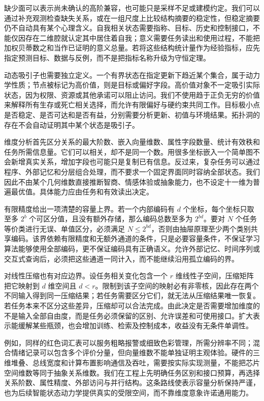 缺少面可以表示尚未确认的高阶兼容，也可能只是采样不足或建模约定。我们可以通过补充观测检查缺失关系，或在一组尺度上比较结构摘要的稳定性，但稳定摘要仍不自动具有某个心理含义。自我相关状态需要指称、目标、历史和控制接口，不能仅因存在二维腔就认定其中居住着自我；意义需要任务读出和使用过程，不能把加权贝蒂数之和当作已证明的意义总量。若将这些结构统计量作为经验指标，应先指定预测目标、数据与反例，而不是把指标名称升级为守恒定理。

动态吸引子也需要独立定义。一个有界状态在指定更新下趋近某个集合，属于动力学性质；节点被标记为高价值，则是目标或偏好字段。高价值对象不一定吸引实际状态，因为权限、资源或其他承诺可以阻止访问。我们不使用趋于正负无穷的价值来解释所有生存或死亡相关选择，而允许有限偏好与硬约束共同工作。目标极小点是否稳定、是否可达和是否有益，分别需要分析更新、初值与环境结果。拓扑洞的存在不会自动证明其中某个状态是吸引子。

维度分析首先区分关系的最大阶数、嵌入向量维数、属性字段数量、统计有效秩和任务所需信息量。它们可以相关，却不是同一个数。用很多坐标嵌入一个简单图不会新增真实关系，增加字段也可能只是复制已有信息。反过来，复杂任务可以通过程序、外部记忆和分层组合处理，而不要求一个固定界面同时容纳全部状态。我们因此不由某个几何维数直接推断智商、情感体验或抽象能力，也不设定十一维为普遍最优值。具体能力应由任务和有效读出决定。

有限精度给出一项清楚的容量上界。若一个内部编码有 $d$ 个坐标，每个坐标只取至多 $2^b$ 个可区分值，且没有额外存储，那么编码总数至多为 $2^{bd}$。要对 $N$ 个任务等价类进行无误、单值区分，必须满足 $N\leq2^{bd}$，否则由抽屉原理至少两个类别共享编码。该界依赖有限精度和无额外通道的条件，只是必要容量条件，不保证学习算法能够使用全部编码，更不保证编码具有正确语义。允许外部记忆、时间序列或交互式查询后，必须把这些通道一同计入，而不能继续沿用孤立编码的界。

对线性压缩也有对应边界。设任务相关变化包含一个 $r$ 维线性子空间，压缩矩阵把它映射到 $d$ 维空间且 $d<r$。限制到该子空间的映射必有非零核，因此存在两个不同输入得到同一压缩结果；若任务需要区分它们，就无法从压缩结果唯一恢复。若任务本来不区分这些差异，压缩却可以合法完成。由此决定是否需要增加维度的不是输入全部自由度，而是任务必须保留的区别、允许误差和可使用接口。扩大表示能缓解某些瓶颈，也会增加训练、检索及控制成本，收益没有无条件单调性。

例如，同样的红色词汇表可以服务粗略报警或细致色彩管理，所需分辨率不同；混合情绪记录可以包含多个评价分量，但向量维数不能单独证明主观体验。硬件的三维堆叠、总线宽度和计算布置影响通信及吞吐，需要按实际实现测量，不能把芯片空间维数等同于抽象关系维数。我们在工程上先明确任务区别和接口预算，再选择关系阶数、属性精度、外部访问与并行结构。这条路线使表示容量分析保持严谨，也为后续智能状态动力学提供真实的受限空间，而不靠维度意象许诺通用能力。

